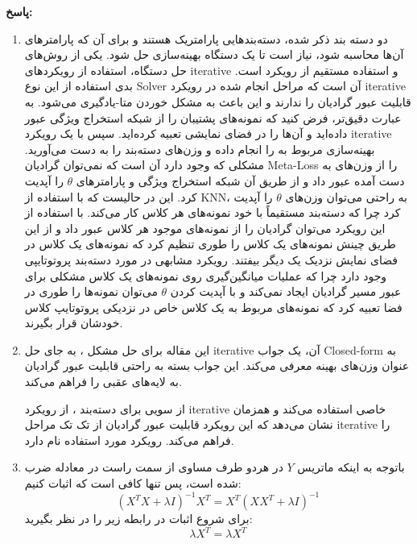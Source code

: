 \documentclass{article}
\begin{document}
\iffalse
\textbf{پاسخ:}

\begin{enumerate}
	\item
دو دسته بند ذکر شده، دسته‌بندهایی پارامتریک هستند و برای آن که پارامترهای آن‌ها محاسبه شود، نیاز است تا یک دستگاه بهینه‌سازی حل شود. یکی از روش‌های حل دستگاه، استفاده از رویکردهای iterative و استفاده مستقیم از رویکرد 
 است. بدی استفاده از این نوع Solver آن است که مراحل انجام شده در رویکرد iterative قابلیت عبور گرادیان را ندارند و این باعث به مشکل خوردن متا-یادگیری می‌شود. به عبارت دقیق‌تر، فرض کنید که نمونه‌های پشتیبان را از شبکه استخراج ویژگی عبور داده‌اید و آن‌ها را در فضای نمایشی تعبیه کرده‌اید. سپس با یک رویکرد iterative بهینه‌سازی مربوط به 
  را انجام داده و وزن‌های دسته‌بند را به دست می‌آورید. مشکلی که وجود دارد آن است که نمی‌توان گرادیان Meta-Loss را از وزن‌های به دست آمده عبور داد و از طریق آن شبکه استخراج ویژگی و پارامترهای 
$\theta$
را آپدیت کرد. این در حالیست که با استفاده از KNN، به راحتی می‌توان وزن‌های 
$\theta$
را آپدیت کرد چرا که دسته‌بند مستقیماً با خود نمونه‌های هر کلاس کار می‌کند. با استفاده از این رویکرد می‌توان گرادیان را از نمونه‌های موجود هر کلاس عبور داد و از این طریق چینش نمونه‌های یک کلاس را طوری تنظیم کرد که نمونه‌های یک کلاس در فضای نمایش نزدیک یک دیگر بیفتند. رویکرد مشابهی در مورد دسته‌بند پروتوتایپی وجود دارد چرا که عملیات میانگین‌گیری روی نمونه‌های یک کلاس مشکلی برای عبور مسیر گرادیان ایجاد نمی‌کند و با آپدیت کردن 
$\theta$
می‌توان نمونه‌ها را طوری در فضا تعبیه کرد که نمونه‌های مربوط به یک کلاس خاص در نزدیکی پروتوتایپ کلاس خودشان قرار بگیرند.
	\item
	این مقاله برای حل مشکل
	، به جای حل iterative آن، یک جواب Closed-form به عنوان وزن‌های بهینه معرفی می‌کند. این جواب بسته به راحتی قابلیت عبور گرادیان به لایه‌های عقبی را فراهم می‌کند.
	
	از سویی برای دسته‌بند
	 ، از رویکرد iterative خاصی استفاده می‌کند و همزمان نشان می‌دهد که این رویکرد قابلیت عبور گرادیان از تک تک مراحل iterative را فراهم می‌کند. رویکرد مورد استفاده 
	نام دارد.
	
	\item
	باتوجه به اینکه ماتریس $Y$ در هردو طرف مساوی از سمت راست در معادله ضرب شده است،‌ پس تنها کافی است که اثبات کنیم:
	$$
	{\left( {{X^T}X + \lambda I} \right)^{ - 1}}{X^T} = {X^T}{\left( {X{X^T} + \lambda I} \right)^{ - 1}}
	$$
	برای شروع اثبات در رابطه زیر را در نظر بگیرید:
	$$
	\lambda {X^T} = \lambda {X^T}
	$$
	

\end{enumerate}
\end{document}
